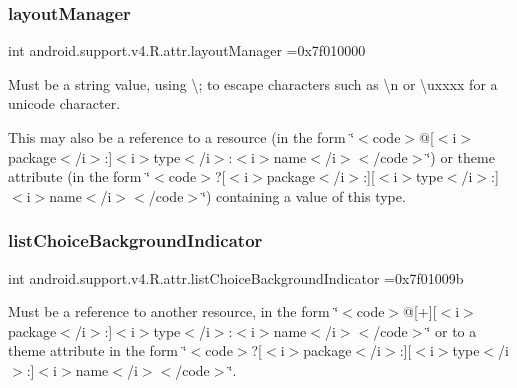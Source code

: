 \subsubsection{\texorpdfstring{layout\+Manager}{layoutManager}}
{\footnotesize\ttfamily int android.\+support.\+v4.\+R.\+attr.\+layout\+Manager =0x7f010000\hspace{0.3cm}{\ttfamily [static]}}

Must be a string value, using \textquotesingle{}\textbackslash{};\textquotesingle{} to escape characters such as \textquotesingle{}\textbackslash{}n\textquotesingle{} or \textquotesingle{}\textbackslash{}uxxxx\textquotesingle{} for a unicode character. 

This may also be a reference to a resource (in the form \char`\"{}$<$code$>$@\mbox{[}$<$i$>$package$<$/i$>$\+:\mbox{]}$<$i$>$type$<$/i$>$\+:$<$i$>$name$<$/i$>$$<$/code$>$\char`\"{}) or theme attribute (in the form \char`\"{}$<$code$>$?\mbox{[}$<$i$>$package$<$/i$>$\+:\mbox{]}\mbox{[}$<$i$>$type$<$/i$>$\+:\mbox{]}$<$i$>$name$<$/i$>$$<$/code$>$\char`\"{}) containing a value of this type. \mbox{\label{classandroid_1_1support_1_1v4_1_1R_1_1attr_af7eefe308947e12a94677f65e23aff36}} 
\subsubsection{\texorpdfstring{list\+Choice\+Background\+Indicator}{listChoiceBackgroundIndicator}}
{\footnotesize\ttfamily int android.\+support.\+v4.\+R.\+attr.\+list\+Choice\+Background\+Indicator =0x7f01009b\hspace{0.3cm}{\ttfamily [static]}}

Must be a reference to another resource, in the form \char`\"{}$<$code$>$@\mbox{[}+\mbox{]}\mbox{[}$<$i$>$package$<$/i$>$\+:\mbox{]}$<$i$>$type$<$/i$>$\+:$<$i$>$name$<$/i$>$$<$/code$>$\char`\"{} or to a theme attribute in the form \char`\"{}$<$code$>$?\mbox{[}$<$i$>$package$<$/i$>$\+:\mbox{]}\mbox{[}$<$i$>$type$<$/i$>$\+:\mbox{]}$<$i$>$name$<$/i$>$$<$/code$>$\char`\"{}. \mbox{\label{classandroid_1_1support_1_1v4_1_1R_1_1attr_af03f26f416a7488e6cc6869ead2e96c7}} 
